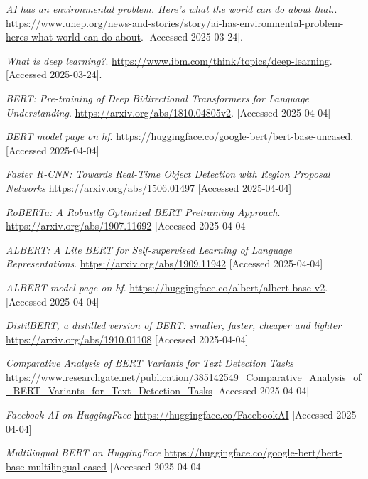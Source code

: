 \documentclass[licencjacka,en]{pracamgr}
\begin{document}
\begin{thebibliography}{99}
    \textit{AI has an environmental problem. Here’s what the world can do about that.}.
    \url{https://www.unep.org/news-and-stories/story/ai-has-environmental-problem-heres-what-world-can-do-about}.
    [Accessed 2025-03-24].

    \textit{What is deep learning?}.
    \url{https://www.ibm.com/think/topics/deep-learning}.
    [Accessed 2025-03-24].

    \textit{BERT: Pre-training of Deep Bidirectional Transformers for Language Understanding}.
    \url{https://arxiv.org/abs/1810.04805v2}.
    [Accessed 2025-04-04]

    \textit{BERT model page on hf}.
    \url{https://huggingface.co/google-bert/bert-base-uncased}.
    [Accessed 2025-04-04]

    \textit{Faster R-CNN: Towards Real-Time Object Detection with Region Proposal Networks}
    \url{https://arxiv.org/abs/1506.01497}
    [Accessed 2025-04-04]

    \textit{RoBERTa: A Robustly Optimized BERT Pretraining Approach}.
    \url{https://arxiv.org/abs/1907.11692}
    [Accessed 2025-04-04]

    \textit{ALBERT: A Lite BERT for Self-supervised Learning of Language Representations}.
    \url{https://arxiv.org/abs/1909.11942}
    [Accessed 2025-04-04]

    \textit{ALBERT model page on hf}.
    \url{https://huggingface.co/albert/albert-base-v2}.
    [Accessed 2025-04-04]

    \textit{DistilBERT, a distilled version of BERT: smaller, faster, cheaper and lighter}
    \url{https://arxiv.org/abs/1910.01108}
    [Accessed 2025-04-04]

    \textit{Comparative Analysis of BERT Variants for Text Detection Tasks}
    \url{https://www.researchgate.net/publication/385142549_Comparative_Analysis_of_BERT_Variants_for_Text_Detection_Tasks}
    [Accessed 2025-04-04]

    \textit{Facebook AI on HuggingFace}
    \url{https://huggingface.co/FacebookAI}
    [Accessed 2025-04-04]

    \textit{Multilingual BERT on HuggingFace}
    \url{https://huggingface.co/google-bert/bert-base-multilingual-cased}
    [Accessed 2025-04-04]


\end{thebibliography}
\end{document}
